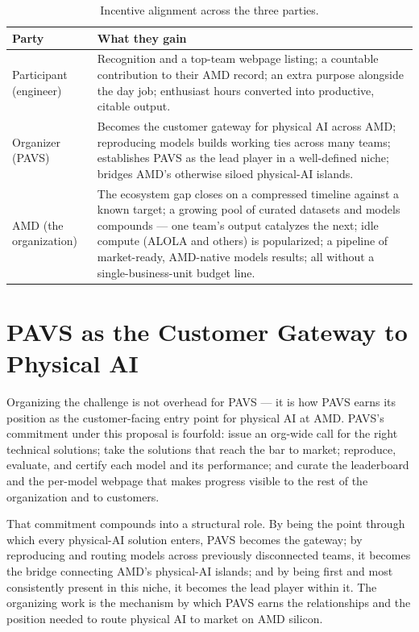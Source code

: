 \documentclass[blind]{gtac}
\begin{document}
\begin{table}[H]
\centering
\caption{Incentive alignment across the three parties.}
\label{tab:incentive}
\tiny
\begin{tabular}{@{}p{0.62in}p{1.9in}@{}}
\toprule
Party & What they gain \\
\midrule
Participant (engineer) & Recognition and a top-team webpage listing; a countable contribution to their AMD record; an extra purpose alongside the day job; enthusiast hours converted into productive, citable output. \\
Organizer (PAVS) & Becomes the customer gateway for physical AI across AMD; reproducing models builds working ties across many teams; establishes PAVS as the lead player in a well-defined niche; bridges AMD's otherwise siloed physical-AI islands. \\
AMD (the organization) & The ecosystem gap closes on a compressed timeline against a known target; a growing pool of curated datasets and models compounds --- one team's output catalyzes the next; idle compute (ALOLA and others) is popularized; a pipeline of market-ready, AMD-native models results; all without a single-business-unit budget line. \\
\bottomrule
\end{tabular}
\end{table}

\section{PAVS as the Customer Gateway to Physical AI}
\label{sec:pavs}

Organizing the challenge is not overhead for PAVS --- it is how PAVS earns its position as the customer-facing entry point for physical AI at AMD. PAVS's commitment under this proposal is fourfold: issue an org-wide call for the right technical solutions; take the solutions that reach the bar to market; reproduce, evaluate, and certify each model and its performance; and curate the leaderboard and the per-model webpage that makes progress visible to the rest of the organization and to customers.

That commitment compounds into a structural role. By being the point through which every physical-AI solution enters, PAVS becomes the gateway; by reproducing and routing models across previously disconnected teams, it becomes the bridge connecting AMD's physical-AI islands; and by being first and most consistently present in this niche, it becomes the lead player within it. The organizing work is the mechanism by which PAVS earns the relationships and the position needed to route physical AI to market on AMD silicon.
\end{document}
